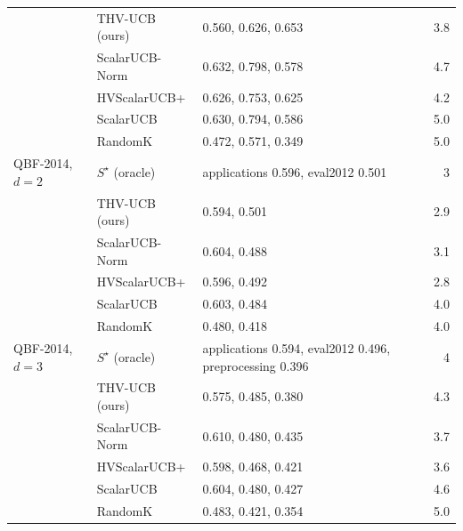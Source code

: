 \begin{tabular}{ll l r}
 & THV-UCB (ours) & 0.560, 0.626, 0.653 & 3.8\\
 & ScalarUCB-Norm & 0.632, 0.798, 0.578 & 4.7\\
 & HVScalarUCB+ & 0.626, 0.753, 0.625 & 4.2\\
 & ScalarUCB & 0.630, 0.794, 0.586 & 5.0\\
 & RandomK & 0.472, 0.571, 0.349 & 5.0\\
\midrule
QBF-2014, $d=2$ & $S^\star$ (oracle) & applications 0.596, eval2012 0.501 & 3\\
 & THV-UCB (ours) & 0.594, 0.501 & 2.9\\
 & ScalarUCB-Norm & 0.604, 0.488 & 3.1\\
 & HVScalarUCB+ & 0.596, 0.492 & 2.8\\
 & ScalarUCB & 0.603, 0.484 & 4.0\\
 & RandomK & 0.480, 0.418 & 4.0\\
\midrule
QBF-2014, $d=3$ & $S^\star$ (oracle) & applications 0.594, eval2012 0.496, preprocessing 0.396 & 4\\
 & THV-UCB (ours) & 0.575, 0.485, 0.380 & 4.3\\
 & ScalarUCB-Norm & 0.610, 0.480, 0.435 & 3.7\\
 & HVScalarUCB+ & 0.598, 0.468, 0.421 & 3.6\\
 & ScalarUCB & 0.604, 0.480, 0.427 & 4.6\\
 & RandomK & 0.483, 0.421, 0.354 & 5.0\\
\bottomrule
\end{tabular}
